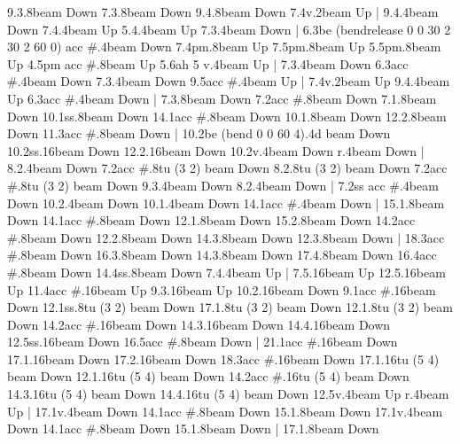       9.3.8{beam Down}
      7.3.8{beam Down}
      9.4.8{beam Down}
      7.4{v}.2{beam Up}
    |
      9.4.4{beam Down}
      7.4.4{beam Up}
      5.4.4{beam Up}
      7.3.4{beam Down}
    |
      6.3{be (bendrelease 0 0 30 2 30 2 60 0) acc #}.4{beam Down}
      7.4{pm}.8{beam Up}
      7.5{pm}.8{beam Up}
      5.5{pm}.8{beam Up}
      4.5{pm acc #}.8{beam Up}
      5.6{ah 5 v}.4{beam Up}
    |
      7.3.4{beam Down}
      6.3{acc #}.4{beam Down}
      7.3.4{beam Down}
      9.5{acc #}.4{beam Up}
    |
      7.4{v}.2{beam Up}
      9.4.4{beam Up}
      6.3{acc #}.4{beam Down}
    |
      7.3.8{beam Down}
      7.2{acc #}.8{beam Down}
      7.1.8{beam Down}
      10.1{ss}.8{beam Down}
      14.1{acc #}.8{beam Down}
      10.1.8{beam Down}
      12.2.8{beam Down}
      11.3{acc #}.8{beam Down}
    |
      10.2{be (bend 0 0 60 4)}.4{d beam Down}
      10.2{ss}.16{beam Down}
      12.2.16{beam Down}
      10.2{v}.4{beam Down}
      r.4{beam Down}
    |
      8.2.4{beam Down}
      7.2{acc #}.8{tu (3 2) beam Down}
      8.2.8{tu (3 2) beam Down}
      7.2{acc #}.8{tu (3 2) beam Down}
      9.3.4{beam Down}
      8.2.4{beam Down}
    |
      7.2{ss acc #}.4{beam Down}
      10.2.4{beam Down}
      10.1.4{beam Down}
      14.1{acc #}.4{beam Down}
    |
      15.1.8{beam Down}
      14.1{acc #}.8{beam Down}
      12.1.8{beam Down}
      15.2.8{beam Down}
      14.2{acc #}.8{beam Down}
      12.2.8{beam Down}
      14.3.8{beam Down}
      12.3.8{beam Down}
    |
      18.3{acc #}.8{beam Down}
      16.3.8{beam Down}
      14.3.8{beam Down}
      17.4.8{beam Down}
      16.4{acc #}.8{beam Down}
      14.4{ss}.8{beam Down}
      7.4.4{beam Up}
    |
      7.5.16{beam Up}
      12.5.16{beam Up}
      11.4{acc #}.16{beam Up}
      9.3.16{beam Up}
      10.2.16{beam Down}
      9.1{acc #}.16{beam Down}
      12.1{ss}.8{tu (3 2) beam Down}
      17.1.8{tu (3 2) beam Down}
      12.1.8{tu (3 2) beam Down}
      14.2{acc #}.16{beam Down}
      14.3.16{beam Down}
      14.4.16{beam Down}
      12.5{ss}.16{beam Down}
      16.5{acc #}.8{beam Down}
    |
      21.1{acc #}.16{beam Down}
      17.1.16{beam Down}
      17.2.16{beam Down}
      18.3{acc #}.16{beam Down}
      17.1.16{tu (5 4) beam Down}
      12.1.16{tu (5 4) beam Down}
      14.2{acc #}.16{tu (5 4) beam Down}
      14.3.16{tu (5 4) beam Down}
      14.4.16{tu (5 4) beam Down}
      12.5{v}.4{beam Up}
      r.4{beam Up}
    |
      17.1{v}.4{beam Down}
      14.1{acc #}.8{beam Down}
      15.1.8{beam Down}
      17.1{v}.4{beam Down}
      14.1{acc #}.8{beam Down}
      15.1.8{beam Down}
    |
      17.1.8{beam Down}
